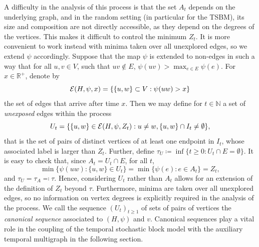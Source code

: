\documentclass[11pt]{article}
\numberwithin{equation}{section}
\theoremstyle{definition}
\newcommand\bN{{\mathbb N}}
\newcommand\bR{{\mathbb R}}
\newcommand\cE{{\cal{E}}}
\begin{document}
A difficulty in the analysis of this process is that the set $A_t$ depends on the underlying graph, and in the random setting (in particular for the TSBM), its size and composition are not directly accessible, as they depend on the degrees of the vertices. This makes it difficult to control the minimum $Z_t$. It is more convenient to work instead with minima taken over all unexplored edges, so we extend $\psi$ accordingly. Suppose that the map $\psi$ is extended to non-edges in such a way that for all $u,v \in V$, such that $uv\notin E$, $\psi(uv) > \max_{e\in E} \psi(e)$. For $x \in \bR^+$, denote by
$$\cE(H,\psi,x) = \{\{u,w\} \subset V: \psi(uw) > x\} $$
the set of edges that arrive after time $x$. Then we may define for $t\in \bN$ a set of \emph{unexposed} edges within the process
$$U_t =  \{\{u,w\} \in \cE(H,\psi,Z_t) :  u\neq w, \{u,w\} \cap I_{t} \neq \emptyset \},$$
that is the set of pairs of distinct vertices of at least one endpoint in $I_t$, whose associated label is larger than $Z_t$. Further, define $\tau_U \coloneqq \inf\{t\geq 0 : U_t \cap E = \emptyset \}$. It is easy to check that, since $A_t = U_t \cap E$, for all $t$,
$$ \min\{\psi(uw) : \{u,w\} \in U_t \} = \min\{\psi(e) : e\in A_t\} = Z_t, $$
and $\tau_U = \tau_A \eqqcolon \tau$. Hence, considering $U_t$ rather than $A_t$ allows for an extension of the definition of $Z_t$ beyond $\tau$. Furthermore, minima are taken over all unexplored edges, so no information on vertex degrees is explicitly required in the analysis of the process. We call the sequence $(U_t)_{t\geq 1}$ of sets of pairs of vertices the \emph{canonical sequence} associated to $(H,\psi)$ and $v$. Canonical sequences play a vital role in the coupling of the temporal stochastic block model with the auxiliary temporal multigraph in the following section.  \\
\end{document}
